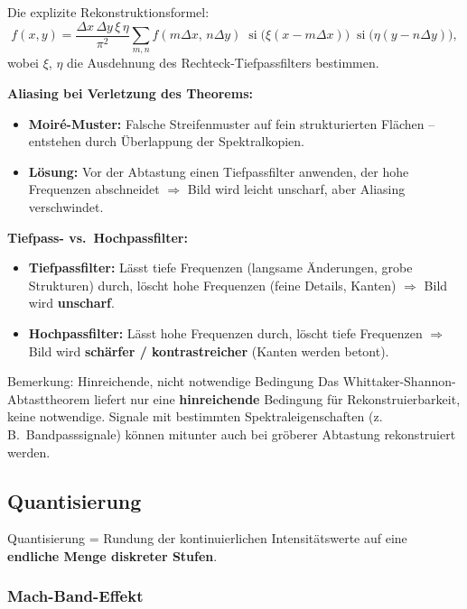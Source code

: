 \documentclass[12pt, a4paper]{article}
\begin{document}
Die explizite Rekonstruktionsformel:
\[
  f(x,y) = \frac{\Delta x\,\Delta y\,\xi\,\eta}{\pi^2}
  \sum_{m,n} f(m\Delta x,\,n\Delta y)\;
  \operatorname{si}\!\bigl(\xi(x - m\Delta x)\bigr)\;
  \operatorname{si}\!\bigl(\eta(y - n\Delta y)\bigr),
\]
wobei $\xi$, $\eta$ die Ausdehnung des Rechteck-Tiefpassfilters bestimmen.

\textbf{Aliasing bei Verletzung des Theorems:}
\begin{itemize}
  \item \textbf{Moiré-Muster:} Falsche Streifenmuster auf fein
        strukturierten Flächen -- entstehen durch Überlappung der Spektralkopien.
  \item \textbf{Lösung:} Vor der Abtastung einen Tiefpassfilter anwenden,
        der hohe Frequenzen abschneidet $\Rightarrow$ Bild wird leicht
        unscharf, aber Aliasing verschwindet.
\end{itemize}

\textbf{Tiefpass- vs.\ Hochpassfilter:}
\begin{itemize}
  \item \textbf{Tiefpassfilter:} Lässt tiefe Frequenzen (langsame Änderungen,
        grobe Strukturen) durch, löscht hohe Frequenzen (feine Details, Kanten)
        $\Rightarrow$ Bild wird \textbf{unscharf}.
  \item \textbf{Hochpassfilter:} Lässt hohe Frequenzen durch, löscht tiefe
        Frequenzen $\Rightarrow$ Bild wird \textbf{schärfer / kontrastreicher}
        (Kanten werden betont).
\end{itemize}

\begin{notebox}{Bemerkung: Hinreichende, nicht notwendige Bedingung}
Das Whittaker-Shannon-Abtasttheorem liefert nur eine \textbf{hinreichende} Bedingung für Rekonstruierbarkeit, keine notwendige. Signale mit bestimmten Spektraleigenschaften (z.\,B.\ Bandpasssignale) können mitunter auch bei gröberer Abtastung rekonstruiert werden.
\end{notebox}

\subsection{Quantisierung}

Quantisierung = Rundung der kontinuierlichen Intensitätswerte auf
eine \textbf{endliche Menge diskreter Stufen}.

\subsubsection*{Mach-Band-Effekt}
\end{document}

